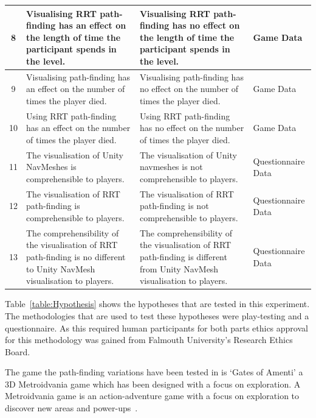 \documentclass[journal]{IEEEtran}
\begin{document}
\begin{table}[h]
\begin{tabular}{|c|p{7cm}|p{7cm}|p{1.75cm}|}
			8 & Visualising RRT path-finding has an effect on the length of time the participant spends in the level. 
			& Visualising RRT path-finding has no effect on the length of time the participant spends in the level.
			& Game Data \\ \hline
			
			9 & Visualising path-finding has an effect on the number of times the player died. 
			& Visualising path-finding has no effect on the number of times the player died.  
			& Game Data \\ \hline
			
			10 & Using RRT path-finding has an effect on the number of times the player died. 
			& Using RRT path-finding has no effect on the number of times the player died.  
			& Game Data \\ \hline
			
			
			11 &   The visualisation of  Unity NavMeshes is comprehensible to players.
			&  The visualisation of  Unity navmeshes is not comprehensible to players.
			& Questionnaire Data \\ \hline
			
			12 &  The visualisation of  RRT path-finding is comprehensible to players.
			&  The visualisation of  RRT path-finding is not comprehensible to players.
			& Questionnaire Data \\ \hline
			
			13 &  The comprehensibility of the visualisation of RRT path-finding is no different to Unity NavMesh visualisation to players.
			&  The comprehensibility of the visualisation of RRT path-finding is different from Unity NavMesh visualisation to players.
			& Questionnaire Data \\ \hline
		\end{tabular}
	\end{table}
	Table~\ref{table:Hypothesis} shows the hypotheses that are tested in this experiment. The methodologies that are used to test these hypotheses were play-testing and a questionnaire. As this required human participants for both parts ethics approval for this methodology was gained from Falmouth University’s Research Ethics Board.
	
	The game the path-finding variations have been tested in is `Gates of Amenti' a 3D Metroidvania game which has been designed with a focus on exploration. A Metroidvania game is an action-adventure game with a focus on exploration to discover new areas and power-ups~\cite{online:metroidvania}.
	
\end{document}
